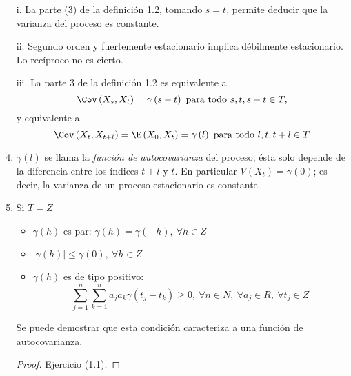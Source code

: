 \begin{observacion}
\quad
\begin{enumerate}
\item[i.] La parte (3) de la definici\'{o}n 1.2, tomando $s=t$, permite deducir que la varianza del proceso es constante.
\item[ii.] Segundo orden y fuertemente estacionario implica d\'{e}bilmente estacionario. Lo rec\'{i}proco no es cierto.
\item[iii.] La parte 3 de la definici\'{o}n 1.2 es equivalente a
\[ 
\Cov\left( X_{s},X_{t} \right)=\gamma \left( s-t \right)\text{ para todo } s,t,s-t\in T,
\]
y equivalente a
\[
\Cov\left( X_{t},X_{t+l} \right)=\E\left( X_{0},X_{t} \right)=\gamma \left( l 
\right)\text{ para todo }  l,t,t+l\in T
\]

\item $\gamma \left( l \right)$ se llama la \emph{funci\'{o}n de autocovarianza} del proceso; \'{e}sta solo depende de la diferencia entre los \'{i}ndices $t+l$ y $t$. En particular $V\left( X_{t} \right)=\gamma (0)$; es decir, la varianza de un proceso estacionario es constante.

\item Si $T=Z $
  \begin{itemize}
  \item $\gamma \left( h \right)$ es par: $\gamma \left( h \right)=\gamma \left( -h \right),\  \forall   h\in Z$
  \item $\left| \gamma \left( h \right) \right|\le \gamma \left( 0 \right),\  \forall h\in Z$ 
  \item $\gamma \left( h \right)$ es de tipo positivo:
  \[
    \sum_{j=1}^n \sum_{k=1}^n {a_{j}a_{k}\gamma \left( t_{j}-t_{k} 
    \right)} \geq 0,
    \ \forall n\in N,\ \forall a_{j}\in R,\ \forall t_{j}\in Z
  \]
  \end{itemize}
Se puede demostrar que esta condici\'{o}n caracteriza a una funci\'{o}n de autocovarianza.

\begin{proof}
 Ejercicio (1.1).\qedhere
\end{proof}
\end{enumerate}
\end{observacion}

